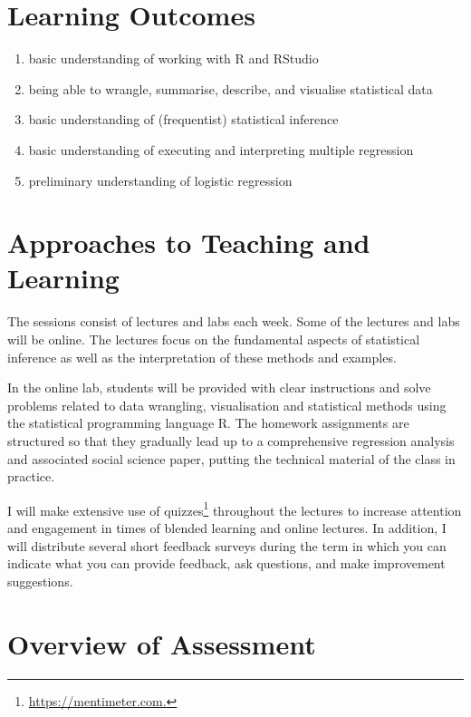 \documentclass[abstract=on,parskip=full,headings=standardclasses,fontsize=11pt,paper=a4]{scrartcl}
\begin{document}
\section*{Learning Outcomes}

\begin{enumerate}
\item basic understanding of working with \textsf{R} and RStudio
\item being able to wrangle, summarise, describe, and visualise statistical data
\item  basic understanding of (frequentist) statistical inference
\item  basic understanding of executing and interpreting multiple regression
\item  preliminary understanding of logistic regression
\end{enumerate}


\section*{Approaches to Teaching and Learning}

The sessions consist of lectures and labs each week. Some of the lectures and labs will be online. The lectures focus on the fundamental aspects of statistical inference as well as the interpretation of these methods and examples. %

In the online lab, students will be provided with clear instructions and solve problems related to data wrangling, visualisation and statistical methods using the statistical programming language R. The homework assignments are structured so that they gradually lead up to a comprehensive regression analysis and associated social science paper, putting the technical material of the class in practice.

I will make extensive use of quizzes\footnote{\url{https://mentimeter.com.}} throughout the lectures to increase attention and engagement in times of blended learning and online lectures. In addition, I will distribute several short feedback surveys during the term in which you can indicate what you can provide feedback, ask questions, and make improvement suggestions. 

\section*{Overview of Assessment}
\end{document}
